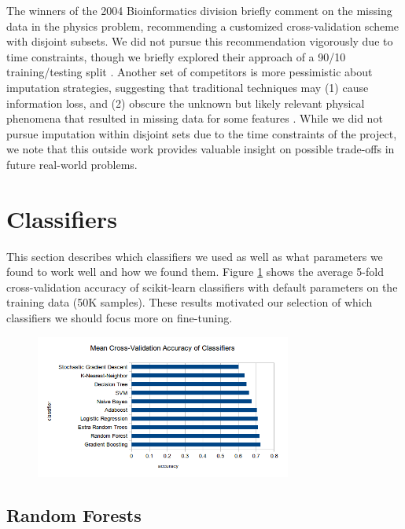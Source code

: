 \documentclass{article}
\begin{document}
The winners of the 2004 Bioinformatics division briefly comment on the missing data in the physics problem, recommending a customized cross-validation scheme with disjoint subsets. 
We did not pursue this recommendation vigorously due to time constraints, though we briefly explored their approach of a 90/10 training/testing split \cite{pfahringer2004weka}.
Another set of competitors is more pessimistic about imputation strategies, suggesting that traditional techniques may (1) cause information loss, and (2) obscure the unknown but likely relevant physical phenomena that resulted in missing data for some features \cite{vogel2004anti}.
While we did not pursue imputation within disjoint sets due to the time constraints of the project, we note that this outside work provides valuable insight on possible trade-offs in future real-world problems.


\section{Classifiers}

This section describes which classifiers we used as well as what parameters we found to work well and how we found them. 
Figure \ref{crossval} shows the average 5-fold cross-validation accuracy of scikit-learn classifiers with default parameters on the training data (50K samples).
These results motivated our selection of which classifiers we should focus more on fine-tuning.

\begin{figure}[!h]
\centering
\includegraphics[width=0.75\textwidth]{crossval}
\label{crossval}
\end{figure}

\subsection{Random Forests}
\end{document}
